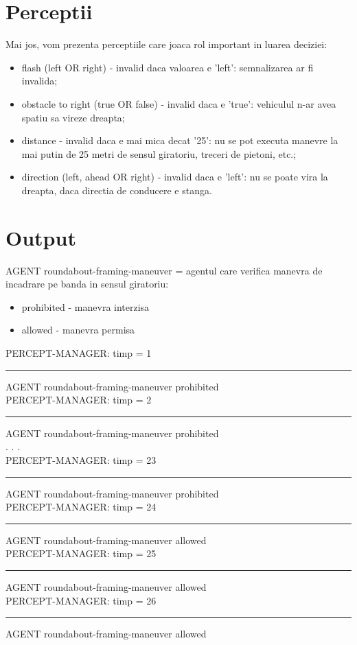 \documentclass[a4paper,12pt]{report}
\begin{document}
\section{Perceptii}
Mai jos, vom prezenta perceptiile care joaca rol important in luarea deciziei: \\
\begin{itemize}
    \item flash (left OR right) - invalid daca valoarea e 'left': semnalizarea ar fi invalida;
    \item obstacle to right (true OR false) - invalid daca e 'true': vehiculul n-ar avea spatiu sa vireze dreapta;
    \item distance - invalid daca e mai mica decat '25': nu se pot executa manevre la mai putin de 25 metri de sensul giratoriu, treceri de pietoni, etc.;
    \item direction (left, ahead OR right) - invalid daca e 'left': nu se poate vira la dreapta, daca directia de conducere e stanga.
\end{itemize}

\section{Output}
AGENT roundabout-framing-maneuver = agentul care verifica manevra de incadrare pe banda in sensul giratoriu: \\
\begin{itemize}
    \item prohibited - manevra interzisa
    \item allowed - manevra permisa
\end{itemize}
PERCEPT-MANAGER: timp = 1 \\
\rule{1cm} *AGENT roundabout-framing-maneuver prohibited \\
 PERCEPT-MANAGER: timp = 2 \\
\rule{1cm} *AGENT roundabout-framing-maneuver prohibited \\
. . . \\
 PERCEPT-MANAGER: timp = 23 \\
\rule{1cm} *AGENT roundabout-framing-maneuver prohibited \\
PERCEPT-MANAGER: timp = 24 \\
\rule{1cm} *AGENT roundabout-framing-maneuver allowed \\
PERCEPT-MANAGER: timp = 25 \\
\rule{1cm} *AGENT roundabout-framing-maneuver allowed \\
PERCEPT-MANAGER: timp = 26 \\
\rule{1cm} *AGENT roundabout-framing-maneuver allowed \\
\end{document}
